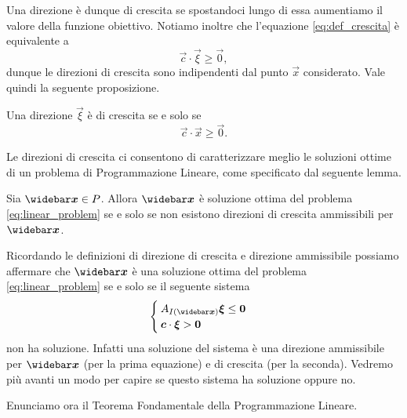 Una direzione è dunque di crescita se spostandoci lungo di essa aumentiamo il valore della funzione obiettivo. Notiamo inoltre che l'equazione \eqref{eq:def_crescita} è equivalente a \[
    \vec c \cdot \vec \xi \geq \vec 0, 
\] dunque le direzioni di crescita sono indipendenti dal punto $\vec x$ considerato. Vale quindi la seguente proposizione.

\begin{proposition}
    Una direzione $\vec \xi$ è di crescita se e solo se \begin{equation}
        \vec c \cdot \vec x \geq \vec 0.
    \end{equation}
\end{proposition}

Le direzioni di crescita ci consentono di caratterizzare meglio le soluzioni ottime di un problema di Programmazione Lineare, come specificato dal seguente lemma.

\begin{lemma}
    Sia $\vecbar x \in P$. Allora $\vecbar x$ è soluzione ottima del problema \eqref{eq:linear_problem} se e solo se non esistono direzioni di crescita ammissibili per $\vecbar x$.
\end{lemma}

Ricordando le definizioni di direzione di crescita e direzione ammissibile possiamo affermare che $\vecbar x$ è una soluzione ottima del problema \eqref{eq:linear_problem} se e solo se il seguente sistema \begin{equation*}
    \begin{cases}
        A_{I(\vecbar x)}\vec \xi \leq \vec 0\\
        \vec c \cdot \vec \xi > \vec 0
    \end{cases}
\end{equation*}
non ha soluzione. Infatti una soluzione del sistema è una direzione ammissibile per $\vecbar x$ (per la prima equazione) e di crescita (per la seconda). Vedremo più avanti un modo per capire se questo sistema ha soluzione oppure no.

Enunciamo ora il Teorema Fondamentale della Programmazione Lineare.

